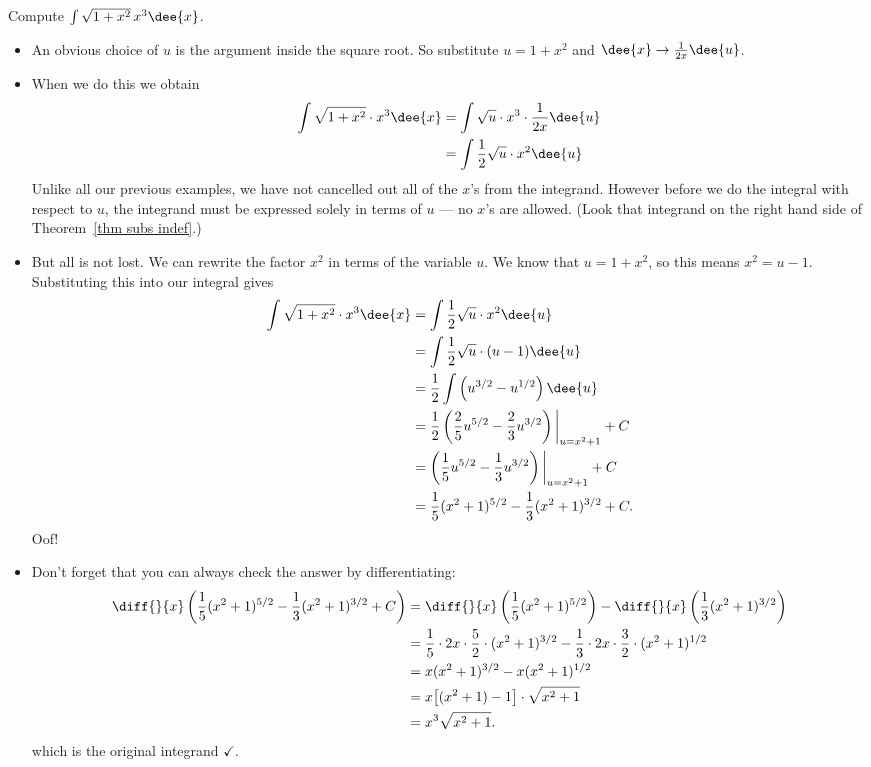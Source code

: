 \begin{eg}\label{eg:substitution8}
Compute $\int \sqrt{1+x^2}\,x^3\dee{x}$.

\begin{itemize}
 \item An obvious choice of $u$ is the argument inside the square root. So substitute
$u=1+x^2$ and $\dee{x} \rightarrow \frac{1}{2x}\dee{u}$.
\item When we do this we obtain
\begin{align*}
  \int \sqrt{1+x^2}\cdot x^3\dee{x}
  &= \int \sqrt{u}\cdot x^3 \cdot \frac{1}{2x}\dee{u}\\
  &= \int \frac{1}{2} \sqrt{u}\cdot x^2 \dee{u}
\end{align*}
Unlike all our previous examples, we have not cancelled out all of the $x$'s from the
integrand. However before we do the integral with respect to $u$, the integrand must be
expressed solely in terms of $u$ --- no $x$'s are allowed. (Look that integrand on the
right hand side of Theorem~\ref{thm subs indef}.)

\item But all is not lost. We can rewrite the factor $x^2$ in terms of the variable $u$.
We know that $u=1+x^2$, so this means $x^2 = u-1$. Substituting this into our integral
gives
\begin{align*}
  \int \sqrt{1+x^2}\cdot x^3\dee{x}
&= \int \frac{1}{2} \sqrt{u}\cdot x^2 \dee{u}\\
&= \int \frac{1}{2} \sqrt{u}\cdot (u-1) \dee{u}\\
&= \frac{1}{2} \int \left(u^{3/2}-u^{1/2}\right) \dee{u}\\
&= \frac{1}{2} \left( \frac{2}{5} u^{5/2} - \frac{2}{3}u^{3/2} \right)\bigg|_{u=x^2+1}
+C\\
&= \left(\frac{1}{5} u^{5/2} - \frac{1}{3}u^{3/2}\right) \bigg|_{u=x^2+1}  +C\\
&= \frac{1}{5}(x^2+1)^{5/2} - \frac{1}{3} (x^2+1)^{3/2} +C.
\end{align*}
Oof!

\item Don't forget that you can always check the answer by differentiating:
\begin{align*}
  \diff{}{x} \left( \frac{1}{5}(x^2+1)^{5/2} - \frac{1}{3} (x^2+1)^{3/2} +C\right)
&= \diff{}{x} \left( \frac{1}{5}(x^2+1)^{5/2} \right) -
\diff{}{x} \left( \frac{1}{3}(x^2+1)^{3/2} \right) \\
&= \frac{1}{5} \cdot 2x \cdot \frac{5}{2} \cdot (x^2+1)^{3/2} -
\frac{1}{3} \cdot 2x \cdot \frac{3}{2} \cdot (x^2+1)^{1/2}\\
&= x (x^2+1)^{3/2} - x(x^2+1)^{1/2} \\
&= x  \big[ (x^2+1)-1 \big] \cdot\sqrt{x^2+1}\\
&= x^3 \sqrt{x^2+1}.
\end{align*}
which is the original integrand $\checkmark$.
\end{itemize}



\end{eg}


